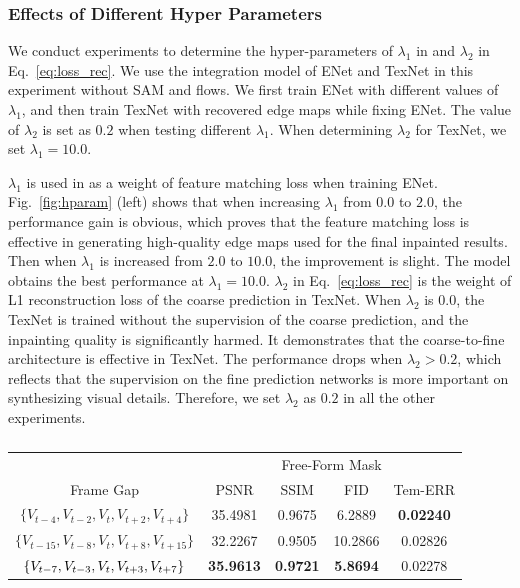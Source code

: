  


\subsubsection{Effects of Different Hyper Parameters}
We conduct experiments to determine the hyper-parameters of $\lambda_1$ in  and $\lambda_2$ in Eq.~\eqref{eq:loss_rec}. 
We use the integration model of ENet and TexNet in this experiment without SAM and flows.
We first train ENet with different values of $\lambda_1$, and then train TexNet with recovered edge maps while fixing ENet. The value of $\lambda_2$ is set as $0.2$ when testing different $\lambda_1$.
When determining $\lambda_2$ for TexNet, we set $\lambda_1=10.0$.

$\lambda_1$ is used in  as a weight of feature matching loss when training ENet.
Fig.~\ref{fig:hparam} (left) shows that when increasing $\lambda_1$ from $0.0$ to $2.0$, the performance gain is obvious, which proves that the feature matching loss is effective in
generating high-quality edge maps used for the final inpainted results. 
Then when $\lambda_1$ is increased from $2.0$ to $10.0$, the improvement is slight.
The model obtains the best performance at $\lambda_1=10.0$.
%
$\lambda_2$ in Eq.~\eqref{eq:loss_rec} is the weight of L1 reconstruction loss of the coarse prediction in TexNet. 
When $\lambda_2$ is $0.0$, the TexNet is trained without the supervision of the coarse prediction, and the inpainting quality is significantly harmed.
It demonstrates that the coarse-to-fine architecture is effective in TexNet. The performance drops when $\lambda_2>0.2$, which reflects that the supervision on the fine prediction networks is more important on synthesizing visual details.
Therefore, we set $\lambda_2$ as $0.2$ in all the other experiments.


\begin{table}[t]
	\caption{ }\smallskip
	\scriptsize
	\centering
	{
		\smallskip\begin{tabular}{c|c|c|c|c}
			\hline
			&\multicolumn{4}{c}{Free-Form Mask}  \\
			\cline{2-5} 
			Frame Gap& PSNR & SSIM & FID & Tem-ERR \\
			
			\hline
			$\{V_{t-4},V_{t-2},V_{t},V_{t+2},V_{t+4}\}$ 
			& 35.4981 & 0.9675 & 6.2889 &\textbf{0.02240} 
			\\ \hline
			$\{V_{t-15},V_{t-8},V_{t},V_{t+8},V_{t+15}\}$ & 32.2267 & 0.9505 &  10.2866 &0.02826
			\\ \hline
		 $\{V_{t-7},V_{t-3},V_{t},V_{t+3},V_{t+7}\}$ &\textbf{35.9613} & \textbf{0.9721}&  \textbf{5.8694} &  0.02278 \\
		
			\hline
			
			
		\end{tabular}
	}
	\label{tab:input-gap}
\end{table}


